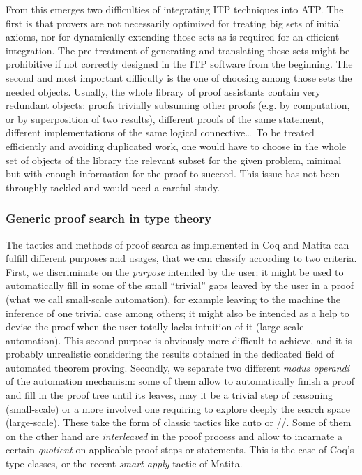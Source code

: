 \documentclass[twoside,a4paper,12pt]{article}
\begin{document}
From this emerges two difficulties of integrating ITP techniques into
ATP. The first is that provers are not necessarily optimized for
treating big sets of initial axioms, nor for dynamically extending
those sets as is required for an efficient integration. The
pre-treatment of generating and translating these sets might be
prohibitive if not correctly designed in the ITP software from the
beginning. The second and most important difficulty is the one of
choosing among those sets the needed objects. Usually, the whole
library of proof assistants contain very redundant objects: proofs
trivially subsuming other proofs (e.g. by computation, or by
superposition of two results), different proofs of the same statement,
different implementations of the same logical connective\ldots\ To be
treated efficiently and avoiding duplicated work, one would have to
choose in the whole set of objects of the library the relevant subset
for the given problem, minimal but with enough information for the
proof to succeed. This issue has not been throughly tackled and would
need a careful study.


\subsubsection{Generic proof search in type theory}
\label{sec:psitp}

The tactics and methods of proof search as implemented in \textsf{Coq}
and \textsf{Matita} can fulfill different purposes and usages, that we
can classify according to two criteria. First, we discriminate on the
\emph{purpose} intended by the user: it might be used to automatically
fill in some of the small ``trivial'' gaps leaved by the user in a
proof (what we call small-scale automation), for example leaving to
the machine the inference of one trivial case among others; it might
also be intended as a help to devise the proof when the user totally
lacks intuition of it (large-scale automation). This second purpose is
obviously more difficult to achieve, and it is probably unrealistic
considering the results obtained in the dedicated field of automated
theorem proving. Secondly, we separate two different \emph{modus
  operandi} of the automation mechanism: some of them allow to
automatically finish a proof and fill in the proof tree until its
leaves, may it be a trivial step of reasoning (small-scale) or a more
involved one requiring to explore deeply the search space
(large-scale). These take the form of classic tactics like
\textsf{auto} or \textsf{//}. Some of them on the other hand are
\emph{interleaved} in the proof process and allow to incarnate a
certain \emph{quotient} on applicable proof steps or statements. This
is the case of \textsf{Coq}'s type classes, or the recent \emph{smart
  apply} tactic of \textsf{Matita}.
\end{document}
